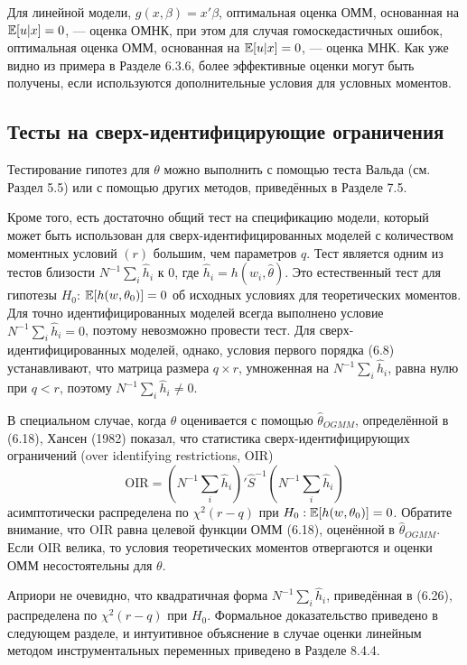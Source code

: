 Для линейной модели, $g(x,\beta)=x'\beta$, оптимальная оценка ОММ, основанная на $\mathbb{E}[u|x]=0$, --- оценка ОМНК, при этом для случая гомоскедастичных ошибок, оптимальная оценка ОММ, основанная на $\mathbb{E}[u|x]=0$, --- оценка МНК. Как уже видно из примера в Разделе 6.3.6, более эффективные оценки могут быть получены, если  используются дополнительные условия для условных моментов.

\subsection{Тесты на сверх-идентифицирующие ограничения}

Тестирование гипотез для $\theta$ можно выполнить с помощью теста Вальда (см. Раздел 5.5) или с помощью других методов, приведённых в Разделе 7.5.

Кроме того, есть достаточно общий тест на спецификацию модели, который может быть использован для сверх-идентифицированных моделей с количеством моментных условий $(r)$ большим, чем параметров $q$. Тест является одним из тестов близости $N^{-1} \sum_i \hat{h}_i$ к 0, где $\hat{h}_i=h(w_i,\hat{\theta})$. Это естественный тест для гипотезы $H_0$: $\mathbb{E}[h(w,\theta_0)]=0$ об исходных условиях для теоретических моментов. Для точно идентифицированных моделей всегда выполнено условие $N^{-1} \sum_i \hat{h}_i=0$, поэтому невозможно провести тест. Для сверх-идентифицированных моделей, однако, условия первого порядка (6.8) устанавливают, что матрица размера $q \times r$, умноженная на $N^{-1} \sum_i \hat{h}_i$, равна нулю при $q < r$, поэтому $N^{-1} \sum_i \hat{h}_i \not= 0$.

В специальном случае, когда $\theta$ оценивается с помощью $\hat{\theta}_{OGMM}$, определённой в (6.18), Хансен (1982) показал, что статистика сверх-идентифицирующих ограничений (over identifying restrictions, OIR)
\begin{equation}
\text{OIR}= \left( N^{-1} \sum_i \hat{h}_i \right)' {\hat{S}}^{-1} \left( N^{-1} \sum_i \hat{h}_i \right)
\end{equation}
асимптотически распределена по $\chi^2(r-q)$ при $H_0: \mathbb{E}[h(w,\theta_0)]=0$. Обратите внимание, что OIR равна целевой функции ОММ (6.18), оценённой в $\hat{\theta}_{OGMM}$. Если OIR велика, то условия теоретических моментов отвергаются и оценки ОММ несостоятельны для $\theta$.

Априори не очевидно, что квадратичная форма $N^{-1} \sum_i \hat{h}_i$, приведённая в (6.26), распределена по $\chi^2(r-q)$ при $H_0$. Формальное доказательство приведено в следующем разделе, и интуитивное объяснение в случае оценки линейным методом инструментальных переменных приведено в Разделе 8.4.4.


